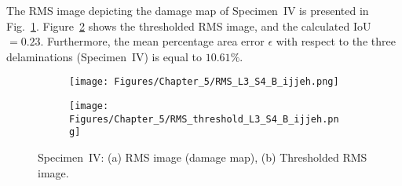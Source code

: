 The RMS image depicting the damage map of Specimen~IV is presented in Fig.~\ref{fig:RMS_L3_S4_B_ijjeh}.
Figure~\ref{fig:RMS_threshold_L3_S4_B_ijjeh} shows the thresholded RMS image, and the calculated IoU\(=0.23\).
Furthermore, the mean percentage area error \(\epsilon\) with respect to the three delaminations (Specimen~IV) is equal to \(10.61\%\).
\begin{figure} [!h]
	\begin{subfigure}[b]{.5\textwidth}
		\centering
		\texttt{[image: Figures/Chapter\_5/RMS\_L3\_S4\_B\_ijjeh.png]}
		\caption{} 
		\label{fig:RMS_L3_S4_B_ijjeh}
	\end{subfigure}
		\hfill
	\begin{subfigure}[b]{.42\textwidth}
		\centering
		\texttt{[image: Figures/Chapter\_5/RMS\_threshold\_L3\_S4\_B\_ijjeh.png]}
		\caption{} 
		\label{fig:RMS_threshold_L3_S4_B_ijjeh}
	\end{subfigure}
	\caption{Specimen~IV: (a) RMS image (damage map), (b) Thresholded RMS image.}
	\label{fig:RMS_L3_S4_B__images}
\end{figure} 
\clearpage